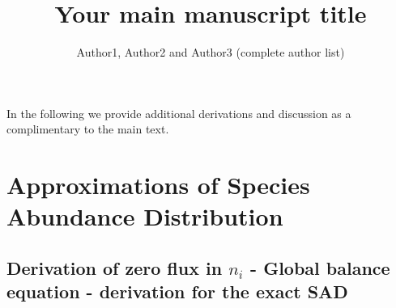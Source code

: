 \documentclass[9pt,twoside,lineno]{pnas-new}
\title{Your main manuscript title}
\author{Author1, Author2 and Author3 (complete author list)}
\begin{document}
\instructionspage  

\maketitle

\SItext
In the following we provide additional derivations and discussion as a complimentary to the main text.
\section*{Approximations of Species Abundance Distribution }

\subsection*{Derivation of zero flux in $n_i$ - Global balance equation - derivation for the exact SAD}
\label{App:ZeroFlux}
\end{document}
